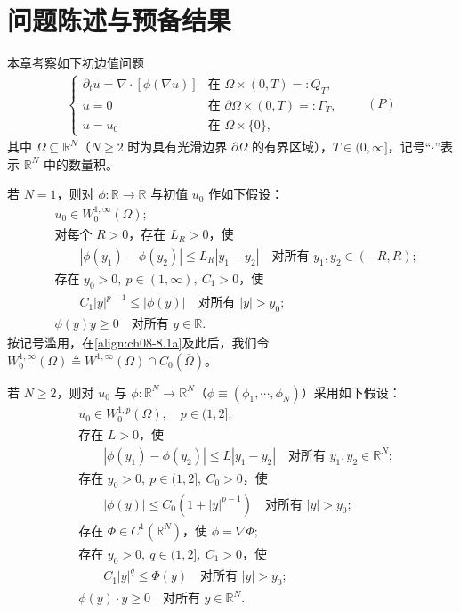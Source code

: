 \documentclass[../../main.tex]{subfiles}%
\begin{document}
\section{问题陈述与预备结果}\label{section:ch08-问题陈述}

本章考察如下初边值问题
\begin{align*}
\begin{cases}
\partial_t u=\nabla\cdot[\phi(\nabla u)] & \text{在 }\Omega\times(0,T)=:Q_T,\\
u=0 & \text{在 }\partial\Omega\times(0,T)=:\Gamma_T,\\
u=u_0 & \text{在 }\Omega\times\{0\},
\end{cases}
\qquad(P)
\end{align*}
其中 $\Omega\subseteq\mathbb{R}^N$（$N\geqslant2$ 时为具有光滑边界 $\partial\Omega$ 的有界区域），$T\in(0,\infty]$，记号“$\cdot$”表示 $\mathbb{R}^N$ 中的数量积。

若 $N=1$，则对 $\phi:\mathbb{R}\to\mathbb{R}$ 与初值 $u_0$ 作如下假设：
\begin{align}
&u_0\in W^{1,\infty}_0(\Omega); \label{align:ch08-8.1a}\\
&\text{对每个 }R>0\text{，存在 }L_R>0\text{，使}\nonumber\\
&\qquad |\phi(y_1)-\phi(y_2)|\leqslant L_R|y_1-y_2|
\quad\text{对所有 }y_1,y_2\in(-R,R); \label{align:ch08-8.1b}\\
&\text{存在 }y_0>0,\ p\in(1,\infty),\ C_1>0\text{，使}\nonumber\\
&\qquad C_1|y|^{p-1}\leqslant|\phi(y)|
\quad\text{对所有 }|y|>y_0; \label{align:ch08-8.1c}\\
&\phi(y)y\geqslant0\quad\text{对所有 }y\in\mathbb{R}. \label{align:ch08-8.1d}
\end{align}
按记号滥用，在\eqref{align:ch08-8.1a}及此后，我们令 $W^{1,\infty}_0(\Omega)\triangleq W^{1,\infty}(\Omega)\cap C_0(\overline\Omega)$。

若 $N\geqslant2$，则对 $u_0$ 与 $\phi:\mathbb{R}^N\to\mathbb{R}^N$（$\phi\equiv(\phi_1,\cdots ,\phi_N)$）采用如下假设：
\begin{align}
&u_0\in W^{1,p}_0(\Omega),\quad p\in(1,2]; \label{align:ch08-8.2a}\\
&\text{存在 }L>0\text{，使}\nonumber\\
&\qquad |\phi(y_1)-\phi(y_2)|\leqslant L|y_1-y_2|
\quad\text{对所有 }y_1,y_2\in\mathbb{R}^N; \label{align:ch08-8.2b}\\
&\text{存在 }y_0>0,\ p\in(1,2],\ C_0>0\text{，使}\nonumber\\
&\qquad |\phi(y)|\leqslant C_0(1+|y|^{p-1})
\quad\text{对所有 }|y|>y_0; \label{align:ch08-8.2c}\\
&\text{存在 }\Phi\in C^1(\mathbb{R}^N)\text{，使 }\phi=\nabla\Phi; \label{align:ch08-8.2d}\\
&\text{存在 }y_0>0,\ q\in(1,2],\ C_1>0\text{，使}\nonumber\\
&\qquad C_1|y|^q\leqslant\Phi(y)
\quad\text{对所有 }|y|>y_0; \label{align:ch08-8.2e}\\
&\phi(y)\cdot y\geqslant0\quad\text{对所有 }y\in\mathbb{R}^N. \label{align:ch08-8.2f}
\end{align}
\end{document}
